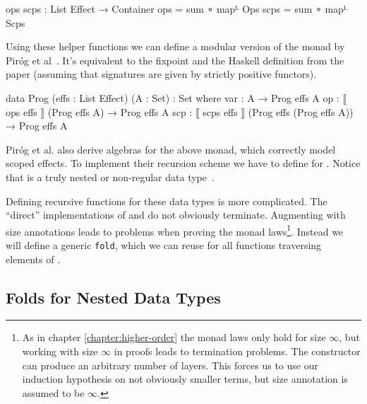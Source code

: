 \begin{code}
ops scps : List Effect → Container
ops   = sum ∘ mapᴸ Ops
scps  = sum ∘ mapᴸ Scps
\end{code}
Using these helper functions we can define a modular version of the monad by
Piróg et al~\cite{DBLP:conf/lics/PirogSWJ18}.
It's equivalent to the fixpoint and the Haskell definition from the paper
(assuming that signatures are given by strictly positive functors).

\begin{code}
data Prog (effs : List Effect) (A : Set) : Set where
  var  :  A                                         → Prog effs A
  op   :  ⟦ ops  effs  ⟧ (Prog effs A)              → Prog effs A
  scp  :  ⟦ scps effs  ⟧ (Prog effs (Prog effs A))  → Prog effs A
\end{code}
Piróg et al. also derive algebras for the above monad, which correctly model
scoped effects.
To implement their recursion scheme we have to define \AgdaFunction{>>=} for 
\AgdaSpace{}\AgdaSpace{}.
Notice that  is a truly nested or non-regular data
type~\cite{DBLP:conf/mpc/BirdM98}.

Defining recursive functions for these data types is more complicated.
The ``direct'' implementations of  and \AgdaFunction{>>=}
do not obviously terminate.
Augmenting  with size annotations leads to problems when
proving the monad laws\footnote{As in chapter \ref{chapter:higher-order} the
  monad laws only hold for size $\infty$, but working with size $\infty$ in
  proofs leads to termination problems.
  The  constructor can produce an arbitrary number
  of \AgdaSpace{} layers.
  This forces us to use our induction hypothesis on not obviously smaller terms,
  but size annotation is assumed to be $\infty$.}.
Instead we will define a generic \texttt{fold}, which we can reuse for all
functions traversing elements of
\AgdaSpace{}\AgdaSpace{}.


\subsection{Folds for Nested Data Types}

